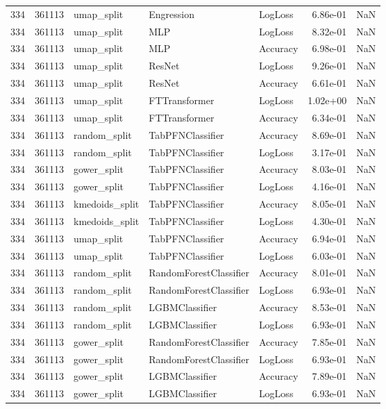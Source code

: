 \begin{tabular}{rrlllrr}
334 & 361113 & umap\_split & Engression & LogLoss & 6.86e-01 & NaN \\
334 & 361113 & umap\_split & MLP & LogLoss & 8.32e-01 & NaN \\
334 & 361113 & umap\_split & MLP & Accuracy & 6.98e-01 & NaN \\
334 & 361113 & umap\_split & ResNet & LogLoss & 9.26e-01 & NaN \\
334 & 361113 & umap\_split & ResNet & Accuracy & 6.61e-01 & NaN \\
334 & 361113 & umap\_split & FTTransformer & LogLoss & 1.02e+00 & NaN \\
334 & 361113 & umap\_split & FTTransformer & Accuracy & 6.34e-01 & NaN \\
334 & 361113 & random\_split & TabPFNClassifier & Accuracy & 8.69e-01 & NaN \\
334 & 361113 & random\_split & TabPFNClassifier & LogLoss & 3.17e-01 & NaN \\
334 & 361113 & gower\_split & TabPFNClassifier & Accuracy & 8.03e-01 & NaN \\
334 & 361113 & gower\_split & TabPFNClassifier & LogLoss & 4.16e-01 & NaN \\
334 & 361113 & kmedoids\_split & TabPFNClassifier & Accuracy & 8.05e-01 & NaN \\
334 & 361113 & kmedoids\_split & TabPFNClassifier & LogLoss & 4.30e-01 & NaN \\
334 & 361113 & umap\_split & TabPFNClassifier & Accuracy & 6.94e-01 & NaN \\
334 & 361113 & umap\_split & TabPFNClassifier & LogLoss & 6.03e-01 & NaN \\
334 & 361113 & random\_split & RandomForestClassifier & Accuracy & 8.01e-01 & NaN \\
334 & 361113 & random\_split & RandomForestClassifier & LogLoss & 6.93e-01 & NaN \\
334 & 361113 & random\_split & LGBMClassifier & Accuracy & 8.53e-01 & NaN \\
334 & 361113 & random\_split & LGBMClassifier & LogLoss & 6.93e-01 & NaN \\
334 & 361113 & gower\_split & RandomForestClassifier & Accuracy & 7.85e-01 & NaN \\
334 & 361113 & gower\_split & RandomForestClassifier & LogLoss & 6.93e-01 & NaN \\
334 & 361113 & gower\_split & LGBMClassifier & Accuracy & 7.89e-01 & NaN \\
334 & 361113 & gower\_split & LGBMClassifier & LogLoss & 6.93e-01 & NaN \\

\end{tabular}
